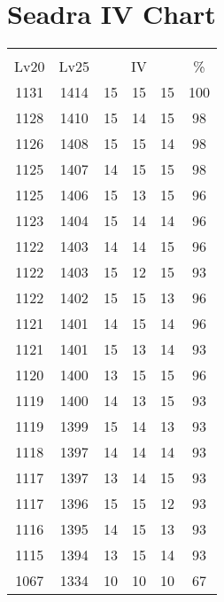 \documentclass{article}%
\begin{document}
%
\normalsize%
\section{Seadra IV Chart}%
\label{sec:Seadra IV Chart}%
\renewcommand{\arraystretch}{1.5}%
\begin{tabular}{|c|c|c|c|c|c|}%
\hline%
\multicolumn{6}{|c|}{\textcolor{white}{ 
\linebreak{Seadra}
}%
\cellcolor{black}}\\%
\multicolumn{1}{|c}{Lv20}&\multicolumn{1}{c|}{Lv25}&\multicolumn{3}{c|}{IV}&\multicolumn{1}{|c|}{\%}\\%
\hline%
\rowcolor{color100}%
1131&1414&15&15&15&100\\%
\hline%
\rowcolor{color98}%
1128&1410&15&14&15&98\\%
\hline%
\rowcolor{color98}%
1126&1408&15&15&14&98\\%
\hline%
\rowcolor{color98}%
1125&1407&14&15&15&98\\%
\hline%
\rowcolor{color96}%
1125&1406&15&13&15&96\\%
\hline%
\rowcolor{color96}%
1123&1404&15&14&14&96\\%
\hline%
\rowcolor{color96}%
1122&1403&14&14&15&96\\%
\hline%
\rowcolor{color93}%
1122&1403&15&12&15&93\\%
\hline%
\rowcolor{color96}%
1122&1402&15&15&13&96\\%
\hline%
\rowcolor{color96}%
1121&1401&14&15&14&96\\%
\hline%
\rowcolor{color93}%
1121&1401&15&13&14&93\\%
\hline%
\rowcolor{color96}%
1120&1400&13&15&15&96\\%
\hline%
\rowcolor{color93}%
1119&1400&14&13&15&93\\%
\hline%
\rowcolor{color93}%
1119&1399&15&14&13&93\\%
\hline%
\rowcolor{color93}%
1118&1397&14&14&14&93\\%
\hline%
\rowcolor{color93}%
1117&1397&13&14&15&93\\%
\hline%
\rowcolor{color93}%
1117&1396&15&15&12&93\\%
\hline%
\rowcolor{color93}%
1116&1395&14&15&13&93\\%
\hline%
\rowcolor{color93}%
1115&1394&13&15&14&93\\%
\hline%
\rowcolor{color91}%
1067&1334&10&10&10&67\\%
\end{tabular}

%
\end{document}
